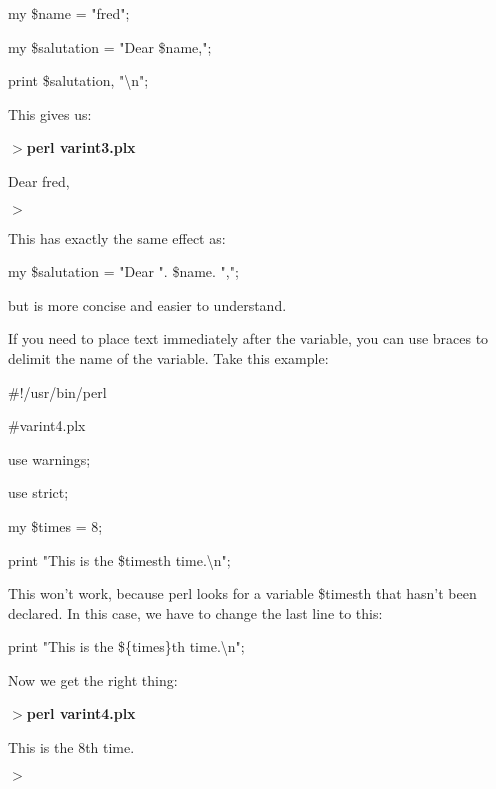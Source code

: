 \documentclass[a4paper,11pt]{book}
\begin{document}
\noindent my \$name = "fred";

\noindent my \$salutation = "Dear \$name,";

\noindent print \$salutation, "\textbackslash n";

\noindent 

\noindent This gives us:

\noindent 

\noindent $>$\textbf{perl varint3.plx}

\noindent Dear fred,

\noindent $>$

\noindent 

\noindent 

\noindent This has exactly the same effect as:

\noindent 

\noindent my \$salutation = "Dear ". \$name. ",";

\noindent 

\noindent but is more concise and easier to understand.

\noindent 

\noindent If you need to place text immediately after the variable, you can use braces to delimit the name of the variable. Take this example:

\noindent 

\noindent \#!/usr/bin/perl

\noindent \#varint4.plx

\noindent use warnings;

\noindent use strict;

\noindent my \$times = 8;

\noindent print "This is the \$timesth time.\textbackslash n";

\noindent 

\noindent This won't work, because perl looks for a variable \$timesth that hasn't been declared. In this case, we have to change the last line to this:

\noindent 

\noindent print "This is the \$\{times\}th time.\textbackslash n";

\noindent 

\noindent Now we get the right thing:

\noindent 

\noindent $>$\textbf{perl varint4.plx}

\noindent This is the 8th time.

\noindent $>$
\end{document}
